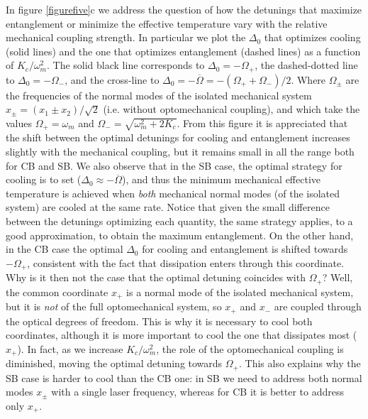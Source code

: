 \documentclass[a4paper]{jpconf}
\begin{document}
 In figure \ref{figurefive}c we address the question of how the detunings that maximize entanglement or minimize the effective temperature vary with the relative mechanical coupling strength. In particular
we plot the $\Delta_0$ that optimizes cooling  (solid lines) and the one that optimizes entanglement (dashed lines) as a function of $K_c/\omega_m^2$. The solid black line 
corresponds to $\Delta_0=-\Omega_+$, the dashed-dotted line to 
$\Delta_0=-\Omega_-$, and the  cross-line to 
$\Delta_0=-\overline{\Omega}=-(\Omega_+ +\Omega_-)/2$. Where $\Omega_\pm$ are 
the frequencies of the normal modes of the isolated mechanical system 
$x_{\pm}=(x_1\pm x_2)/\sqrt{2}$ (i.e. without optomechanical coupling), and 
which take the values $\Omega_+=\omega_m$ and 
$\Omega_-=\sqrt{\omega_m^2+2K_c}$.  From this figure it is appreciated that the shift between the optimal detunings for cooling and entanglement increases slightly with the mechanical coupling, but it remains small
in all the range both for CB and SB.
We  also observe that in the SB case, the optimal strategy for cooling is to set 
($\Delta_0\approx-\overline{\Omega}$), and thus the minimum 
mechanical effective temperature is achieved when {\it both} mechanical normal modes (of the 
isolated system) are cooled at the same rate.  Notice that given the small difference between the detunings optimizing each quantity, the same strategy applies, to a good approximation, to obtain
the maximum entanglement.
On the other hand, in the CB case 
the optimal $\Delta_0$  for cooling and entanglement is shifted towards $-\Omega_+$,  consistent with the fact that
dissipation enters through this coordinate. Why is it then not the case that the optimal
detuning coincides with $\Omega_+$? Well, the common coordinate $x_+$ is a normal mode of the 
isolated mechanical system, but it is {\it not} of the full optomechanical system, so $x_+$ and $x_-$ are 
coupled through the optical degrees of freedom. This is why it is necessary to cool both coordinates,
although it is more important to cool the one that dissipates most ($x_+$). In fact, as we increase
$K_c/\omega_m^2$, the role of the optomechanical coupling is diminished, moving the optimal detuning 
towards $\Omega_+$. This also explains why the SB case is harder to cool than the CB one: in SB 
we need to address both normal modes $x_\pm$ with a single laser frequency, whereas for CB it is better to address only $x_+$.
\end{document}
